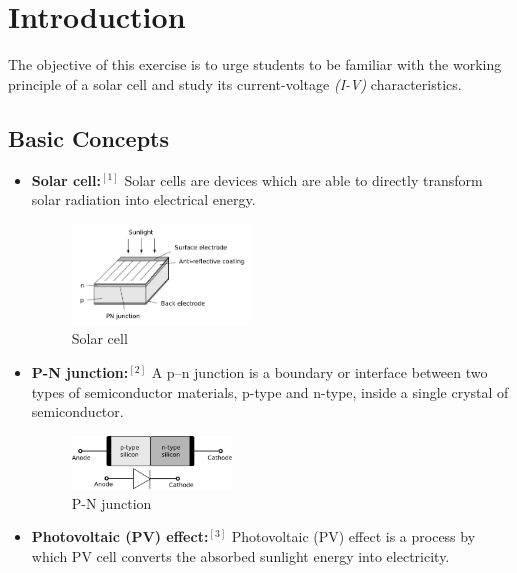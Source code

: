 \documentclass[a4paper]{article}
\begin{document}


\newpage
\tableofcontents
\setcounter{page}{1}

\newpage
\listoffigures
\listoftables

\newpage
\section{Introduction}
The objective of this exercise is to urge students to be familiar with the working principle of a solar cell and study its current-voltage \textit{(I-V)} characteristics.

\subsection{Basic Concepts}
\begin{itemize}
	\item \textbf{Solar cell:}$^{[1]}$ Solar cells are devices which are able to directly transform solar radiation into electrical energy.
	      \begin{figure}[!htbp]
		      \centering
		      \includegraphics[width=0.45\textwidth]{solar_cell.png}
		      \caption{Solar cell}
	      \end{figure}
	\item \textbf{P-N junction:}$^{[2]}$ A p–n junction is a boundary or interface between two types of semiconductor materials, p-type and n-type, inside a single crystal of semiconductor.
	      \begin{figure}[!htbp]
		      \centering
		      \includegraphics[width=0.4\textwidth]{pn_junction.jpg}
		      \caption{P-N junction}
	      \end{figure}
	\item \textbf{Photovoltaic (PV) effect:}$^{[3]}$ Photovoltaic (PV) effect is a process by which PV cell converts the absorbed sunlight energy into electricity.
	      \begin{figure}[!htbp]

\end{figure}
\end{itemize}
\end{document}
